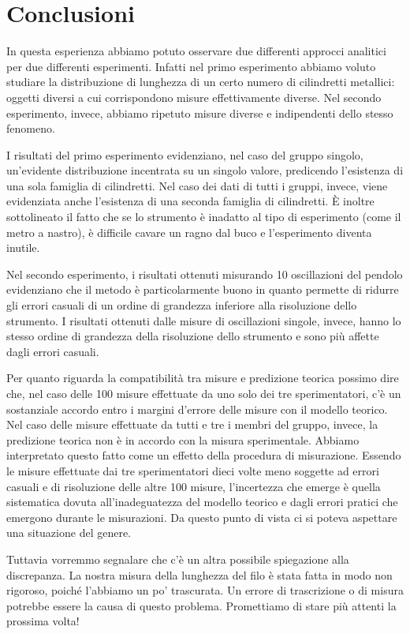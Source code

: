 \section{Conclusioni}

In questa esperienza abbiamo potuto osservare due differenti approcci analitici per due
differenti esperimenti. Infatti nel primo esperimento abbiamo voluto studiare la
distribuzione di lunghezza di un certo numero di cilindretti metallici: oggetti
diversi a cui corrispondono misure effettivamente diverse. Nel secondo esperimento,
invece, abbiamo ripetuto misure diverse e indipendenti dello stesso fenomeno.

I risultati del primo esperimento evidenziano, nel caso del gruppo singolo, un'evidente
distribuzione incentrata su un singolo valore, predicendo l'esistenza di una sola famiglia
di cilindretti. Nel caso dei dati di tutti i gruppi, invece, viene evidenziata anche
l'esistenza di una seconda famiglia di cilindretti. È inoltre sottolineato il fatto che
se lo strumento è inadatto al tipo di esperimento (come il metro a nastro),
è difficile cavare un ragno dal buco e l'esperimento diventa inutile.

Nel secondo esperimento, i risultati ottenuti misurando 10 oscillazioni del pendolo
evidenziano che il metodo è particolarmente buono in quanto permette di ridurre gli errori
casuali di un ordine di grandezza inferiore alla risoluzione dello strumento.
I risultati ottenuti dalle misure di oscillazioni singole, invece, hanno lo stesso ordine
di grandezza della risoluzione dello strumento e sono più affette dagli errori casuali.

Per quanto riguarda la compatibilità tra misure e predizione teorica possimo dire che,
nel caso delle 100 misure effettuate da uno solo dei tre sperimentatori, c'è un sostanziale
accordo entro i margini d'errore delle misure con il modello teorico. Nel caso delle misure
effettuate da tutti e tre i membri del gruppo, invece, la predizione teorica non è in accordo
con la misura sperimentale. Abbiamo interpretato questo fatto come un effetto della procedura
di misurazione. Essendo le misure effettuate dai tre sperimentatori dieci volte meno soggette
ad errori casuali e di risoluzione delle altre 100 misure, l'incertezza che emerge è quella
sistematica dovuta all'inadeguatezza del modello teorico e dagli errori pratici che
emergono durante le misurazioni. Da questo punto di vista ci si poteva aspettare una
situazione del genere.

Tuttavia vorremmo segnalare che c'è un altra possibile spiegazione alla discrepanza.
La nostra misura della lunghezza del filo è stata fatta in modo non rigoroso, poiché
l'abbiamo un po' trascurata. Un errore di trascrizione o di misura potrebbe essere la causa
di questo problema. Promettiamo di stare più attenti la prossima volta!
